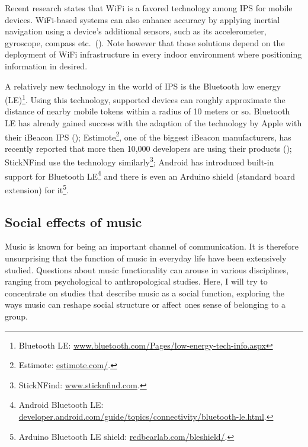 \documentclass[a4paper,11pt]{article}
\begin{document}
Recent research states that WiFi is a favored technology among IPS for mobile devices.
WiFi-based systems can also enhance accuracy by applying inertial navigation using a device's additional sensors, such as its accelerometer, gyroscope, compass etc.\ (\cite{web:harrop}).
Note however that those solutions depend on the deployment of WiFi infrastructure in every indoor environment where positioning information in desired.

A relatively new technology in the world of IPS is the Bluetooth low energy (LE)\footnote{Bluetooth LE: \href{http://www.bluetooth.com/Pages/low-energy-tech-info.aspx}{www.bluetooth.com/Pages/low-energy-tech-info.aspx}}.
Using this technology, supported devices can roughly approximate the distance of nearby mobile tokens within a radius of 10 meters or so.
Bluetooth LE has already gained success with the adaption of the technology by Apple with their iBeacon IPS (\cite{web:danova});
Estimote\footnote{Estimote: \href{http://estimote.com/}{estimote.com/}.}, one of the biggest iBeacon manufacturers, has recently reported that more then 10,000 developers are using their products (\cite{web:thompson});
StickNFind use the technology similarly\footnote{StickNFind: \href{https://www.sticknfind.com}{www.sticknfind.com}.};
Android has introduced built-in support for Bluetooth LE\footnote{Android Bluetooth LE: \href{http://developer.android.com/guide/topics/connectivity/bluetooth-le.html}{developer.android.com/guide/topics/connectivity/bluetooth-le.html}.} and there is even an Arduino shield (standard board extension) for it\footnote{Arduino Bluetooth LE shield: \href{http://redbearlab.com/bleshield/}{redbearlab.com/bleshield/}.}.

\subsection{Social effects of music} \label{literature:social_effects}

Music is known for being an important channel of communication.
It is therefore unsurprising that the function of music in everyday life have been extensively studied.
Questions about music functionality can arouse in various disciplines, ranging from psychological to anthropological studies.
Here, I will try to concentrate on studies that describe music as a social function, exploring the ways music can reshape social structure or affect ones sense of belonging to a group.
\end{document}
